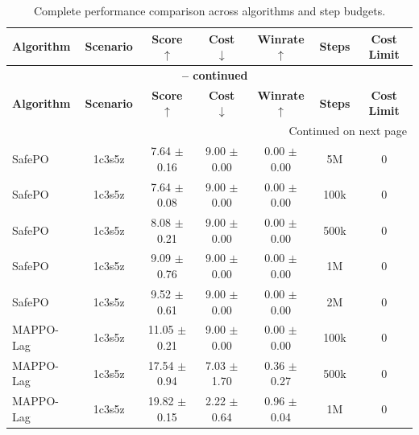 \documentclass{article}
\begin{document}
\begin{longtable}{lcccccc}
\caption{Complete performance comparison across algorithms and step budgets.}
\label{tab:complete_performance_comparison_100k} \\
\toprule
\textbf{Algorithm} & \textbf{Scenario} & \textbf{Score} $\uparrow$ & \textbf{Cost} $\downarrow$ & \textbf{Winrate} $\uparrow$ & \textbf{Steps} & \textbf{Cost Limit} \\
\midrule
\endfirsthead
\multicolumn{7}{c}{{\bfseries \tablename\ \thetable{} -- continued}} \\
\toprule
\textbf{Algorithm} & \textbf{Scenario} & \textbf{Score} $\uparrow$ & \textbf{Cost} $\downarrow$ & \textbf{Winrate} $\uparrow$ & \textbf{Steps} & \textbf{Cost Limit} \\
\midrule
\endhead
\midrule \multicolumn{7}{r}{{Continued on next page}} \\
\endfoot
\bottomrule
\endlastfoot
SafePO & 1c3s5z & \textcolor{green!60!black}{7.64 $\pm$ 0.16} & \textcolor{green!60!black}{9.00 $\pm$ 0.00} & \textcolor{green!60!black}{0.00 $\pm$ 0.00} & 5M & 0 \\
SafePO & 1c3s5z & \textcolor{green!60!black}{7.64 $\pm$ 0.08} & \textcolor{green!60!black}{9.00 $\pm$ 0.00} & \textcolor{green!60!black}{0.00 $\pm$ 0.00} & 100k & 0 \\
SafePO & 1c3s5z & \textcolor{green!60!black}{8.08 $\pm$ 0.21} & \textcolor{green!60!black}{9.00 $\pm$ 0.00} & \textcolor{green!60!black}{0.00 $\pm$ 0.00} & 500k & 0 \\
SafePO & 1c3s5z & \textcolor{green!60!black}{9.09 $\pm$ 0.76} & \textcolor{green!60!black}{9.00 $\pm$ 0.00} & \textcolor{green!60!black}{0.00 $\pm$ 0.00} & 1M & 0 \\
SafePO & 1c3s5z & \textcolor{green!60!black}{9.52 $\pm$ 0.61} & \textcolor{green!60!black}{9.00 $\pm$ 0.00} & \textcolor{green!60!black}{0.00 $\pm$ 0.00} & 2M & 0 \\
MAPPO-Lag & 1c3s5z & \textcolor{green!60!black}{11.05 $\pm$ 0.21} & \textcolor{green!60!black}{9.00 $\pm$ 0.00} & \textcolor{green!60!black}{0.00 $\pm$ 0.00} & 100k & 0 \\
MAPPO-Lag & 1c3s5z & \textcolor{green!60!black}{17.54 $\pm$ 0.94} & \textcolor{green!60!black}{7.03 $\pm$ 1.70} & \textcolor{green!60!black}{0.36 $\pm$ 0.27} & 500k & 0 \\
MAPPO-Lag & 1c3s5z & \textcolor{red!70!black}{19.82 $\pm$ 0.15} & \textcolor{red!70!black}{2.22 $\pm$ 0.64} & \textcolor{red!70!black}{0.96 $\pm$ 0.04} & 1M & 0 \\

\end{longtable}
\end{document}
